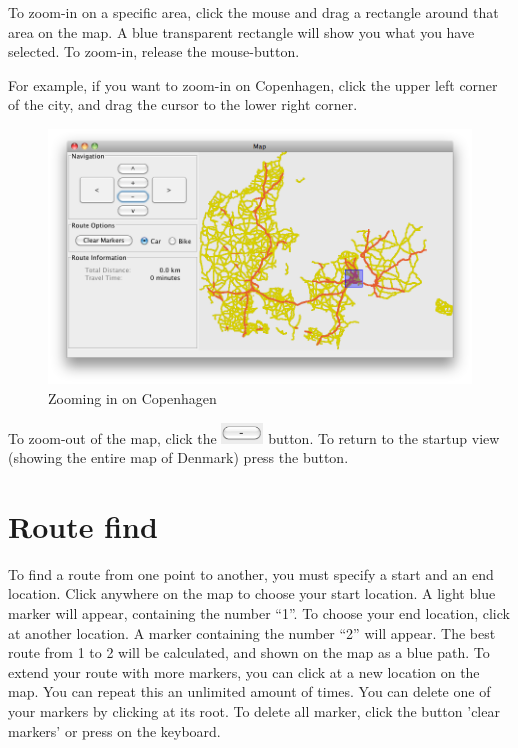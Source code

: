 To zoom-in on a specific area, click the mouse and drag a rectangle around that
area on the map. A blue transparent rectangle will show you what you have
selected. To zoom-in, release the mouse-button.

For example, if you want to zoom-in on Copenhagen,
click the upper left corner of the city, and drag the cursor to the lower right
corner.

\begin{figure}[h!]
\centering
\includegraphics[width=1\linewidth]{images/man-copenhagen.png}
\caption{Zooming in on Copenhagen}
\label{MAN-Z-COP}
\end{figure}

To zoom-out of the map, click the
\includegraphics[height=1.5em]{images/zoomoutbutton.png} button. To return to
the startup view (showing the entire map of Denmark) press the  button.

\section{Route find}
\label{MAN-RF}
To find a route from one point to another, you must specify a start and an end
location. Click anywhere on the map to choose your start location. A light blue
marker will appear, containing the number ``1''. To choose your end location,
click at another location. A marker containing the number ``2'' will appear. The
best route from 1 to 2 will be calculated, and shown on the map as a blue path.
To extend your route with more markers, you can click at a new location on the
map. You can repeat this an unlimited amount of times. You can delete one of
your markers by clicking at its root. To delete all marker, click the button
'clear markers' or press  on the keyboard.

